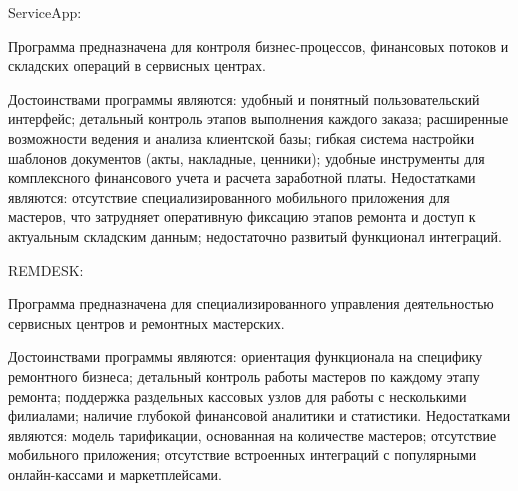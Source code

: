 ServiceApp:

Программа предназначена для контроля бизнес-процессов, финансовых потоков и складских операций в сервисных центрах.

Достоинствами программы являются: удобный и понятный пользовательский интерфейс; детальный контроль этапов выполнения каждого заказа; расширенные возможности ведения и анализа клиентской базы; гибкая система настройки шаблонов документов (акты, накладные, ценники); удобные инструменты для комплексного финансового учета и расчета заработной платы.
Недостатками являются: отсутствие специализированного мобильного приложения для мастеров, что затрудняет оперативную фиксацию этапов ремонта и доступ к актуальным складским данным; недостаточно развитый функционал интеграций.

REMDESK:

Программа предназначена для специализированного управления деятельностью сервисных центров и ремонтных мастерских.

Достоинствами программы являются: ориентация функционала на специфику ремонтного бизнеса; детальный контроль работы мастеров по каждому этапу ремонта; поддержка раздельных кассовых узлов для работы с несколькими филиалами; наличие глубокой финансовой аналитики и статистики.
Недостатками являются: модель тарификации, основанная на количестве мастеров; отсутствие мобильного приложения; отсутствие встроенных интеграций с популярными онлайн-кассами и маркетплейсами.





